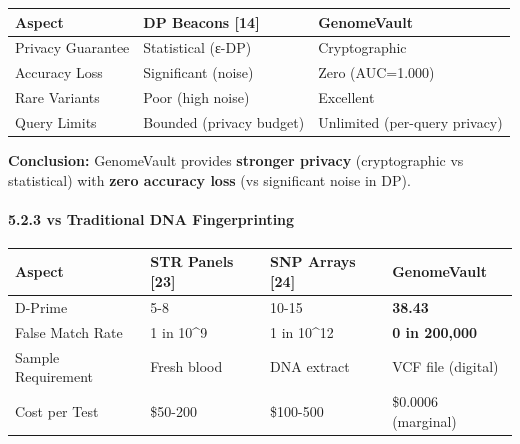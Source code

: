 \documentclass[
  11pt,
]{article}
\begin{document}
\begin{longtable}[]{@{}
  >{\raggedright\arraybackslash}p{}
  >{\raggedright\arraybackslash}p{}
  >{\raggedright\arraybackslash}p{}@{}}
\toprule\noalign{}
\begin{minipage}[b]{\linewidth}\raggedright
Aspect
\end{minipage} & \begin{minipage}[b]{\linewidth}\raggedright
DP Beacons {[}14{]}
\end{minipage} & \begin{minipage}[b]{\linewidth}\raggedright
GenomeVault
\end{minipage} \\
\midrule\noalign{}
\endhead
\bottomrule\noalign{}
\endlastfoot
Privacy Guarantee & Statistical (ε-DP) & Cryptographic \\
Accuracy Loss & Significant (noise) & Zero (AUC=1.000) \\
Rare Variants & Poor (high noise) & Excellent \\
Query Limits & Bounded (privacy budget) & Unlimited (per-query
privacy) \\
\end{longtable}

\textbf{Conclusion:} GenomeVault provides \textbf{stronger privacy}
(cryptographic vs statistical) with \textbf{zero accuracy loss} (vs
significant noise in DP).

\paragraph{5.2.3 vs Traditional DNA
Fingerprinting}\label{vs-traditional-dna-fingerprinting}

\begin{longtable}[]{@{}llll@{}}
\toprule\noalign{}
Aspect & STR Panels {[}23{]} & SNP Arrays {[}24{]} & GenomeVault \\
\midrule\noalign{}
\endhead
\bottomrule\noalign{}
\endlastfoot
D-Prime & 5-8 & 10-15 & \textbf{38.43} \\
False Match Rate & 1 in 10\^{}9 & 1 in 10\^{}12 & \textbf{0 in
200,000} \\
Sample Requirement & Fresh blood & DNA extract & VCF file (digital) \\
Cost per Test & \$50-200 & \$100-500 & \$0.0006 (marginal) \\
\end{longtable}
\end{document}
